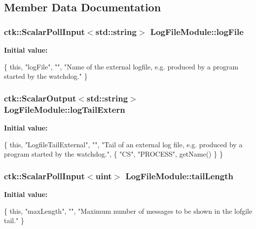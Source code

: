\subsection{Member Data Documentation}
\subsubsection[{\texorpdfstring{log\+File}{logFile}}]{\setlength{\rightskip}{0pt plus 5cm}ctk\+::\+Scalar\+Poll\+Input$<$std\+::string$>$ Log\+File\+Module\+::log\+File}\hypertarget{structLogFileModule_aae277497447f33b30aceb136cc412344}{}\label{structLogFileModule_aae277497447f33b30aceb136cc412344}
{\bfseries Initial value\+:}
\begin{DoxyCode}
\{ \textcolor{keyword}{this}, \textcolor{stringliteral}{"logFile"}, \textcolor{stringliteral}{""},
    \textcolor{stringliteral}{"Name of the external logfile, e.g. produced by a program started by the watchdog."} \}
\end{DoxyCode}
\subsubsection[{\texorpdfstring{log\+Tail\+Extern}{logTailExtern}}]{\setlength{\rightskip}{0pt plus 5cm}ctk\+::\+Scalar\+Output$<$std\+::string$>$ Log\+File\+Module\+::log\+Tail\+Extern}\hypertarget{structLogFileModule_afef78b1e59ea66aeb8196dd4965981a0}{}\label{structLogFileModule_afef78b1e59ea66aeb8196dd4965981a0}
{\bfseries Initial value\+:}
\begin{DoxyCode}
\{ \textcolor{keyword}{this}, \textcolor{stringliteral}{"LogfileTailExternal"}, \textcolor{stringliteral}{""},
    \textcolor{stringliteral}{"Tail of an external log file, e.g. produced by a program started by the watchdog."},
    \{ \textcolor{stringliteral}{"CS"}, \textcolor{stringliteral}{"PROCESS"}, getName() \} \}
\end{DoxyCode}
\subsubsection[{\texorpdfstring{tail\+Length}{tailLength}}]{\setlength{\rightskip}{0pt plus 5cm}ctk\+::\+Scalar\+Poll\+Input$<$uint$>$ Log\+File\+Module\+::tail\+Length}\hypertarget{structLogFileModule_a25e22dfe0545049073115281bf8ac9aa}{}\label{structLogFileModule_a25e22dfe0545049073115281bf8ac9aa}
{\bfseries Initial value\+:}
\begin{DoxyCode}
\{ \textcolor{keyword}{this}, \textcolor{stringliteral}{"maxLength"}, \textcolor{stringliteral}{""},
    \textcolor{stringliteral}{"Maximum number of messages to be shown in the lofgile tail."} \}
\end{DoxyCode}
